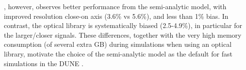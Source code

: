 \documentclass[../main-v1.tex]{subfiles}
\begin{document}
, however, observes better performance from the
semi-analytic model, with improved  resolution close-on axis
(3.6\% vs 5.6\%), and less than 1\% bias. In contrast, the
optical library is systematically biased (2.5-4.9\%), in particular for
the larger/closer signals. These differences, together with the very high memory
consumption (of several extra GB) during simulations when using an
optical library, motivate the choice of the semi-analytic model as the
default for fast simulations in the DUNE .





\end{document}
